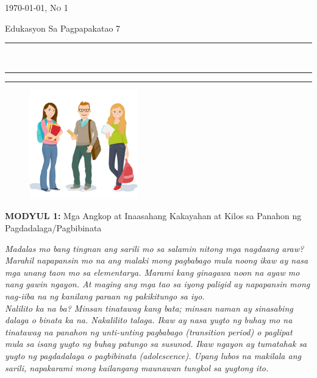 \documentclass[10pt,a4paper]{article}
\newcommand{\HorRule}[1]{\noindent\rule{\linewidth}{#1}} %
\newcommand{\SepRule}{\noindent							 %
						\begin{center}
							\rule{250pt}{1pt}
						\end{center}
						}
\newcommand{\JournalName}[1]{%
		\begin{center}	
			\Huge \usefont{T1}{augie}{m}{n}
			#1%
		\end{center}	
		\par \normalsize \normalfont}
\newcommand{\JournalIssue}[1]{%
		\hfill \textsc{\mydate \today, No #1}
		\par \normalsize \normalfont}
\newcommand{\NewsItem}[1]{%
		\usefont{T1}{augie}{m}{n} 	
		\large #1 \vspace{4pt}
		\par \normalsize \normalfont}
\begin{document}
\JournalIssue{1}
\JournalName{Edukasyon Sa Pagpapakatao 7}
\noindent\HorRule{3pt} \\[-0.75\baselineskip]
\HorRule{1pt}

\vspace{0.5cm}
	\SepRule
\vspace{0.5cm}

\begin{center}
\begin{minipage}[h]{0.75\linewidth}
	\begin{figure}
		\includegraphics[width=0.42\textwidth]{G7_Modyul_Images/student-university-college-education-vector-college-students.png}
		\\	%
	\end{figure}
	
	\NewsItem{\textbf{MODYUL 1: }Mga Angkop at Inaasahang Kakayahan at Kilos sa Panahon ng Pagdadalaga/Pagbibinata}
	\emph{Madalas mo bang tingnan ang sarili mo sa salamin nitong mga nagdaang araw? Marahil napapansin mo na ang malaki mong pagbabago mula noong ikaw ay nasa mga unang taon mo sa elementarya. Marami kang ginagawa noon na ayaw mo nang gawin ngayon. At maging ang mga tao sa iyong paligid ay napapansin mong nag-iiba na ng kanilang paraan ng pakikitungo sa iyo.\\
    Nalilito ka na ba? Minsan tinatawag kang bata; minsan naman ay sinasabing dalaga o binata ka na. Nakalilito talaga. Ikaw ay nasa yugto ng buhay mo na tinatawag na panahon ng unti-unting pagbabago (transition period) o paglipat mula sa isang yugto ng buhay patungo sa susunod. Ikaw ngayon ay tumatahak sa yugto ng pagdadalaga o pagbibinata (adolescence). Upang lubos na makilala ang sarili, napakarami mong kailangang maunawan tungkol sa yugtong ito.}
\end{minipage}
\end{center}
\end{document}
